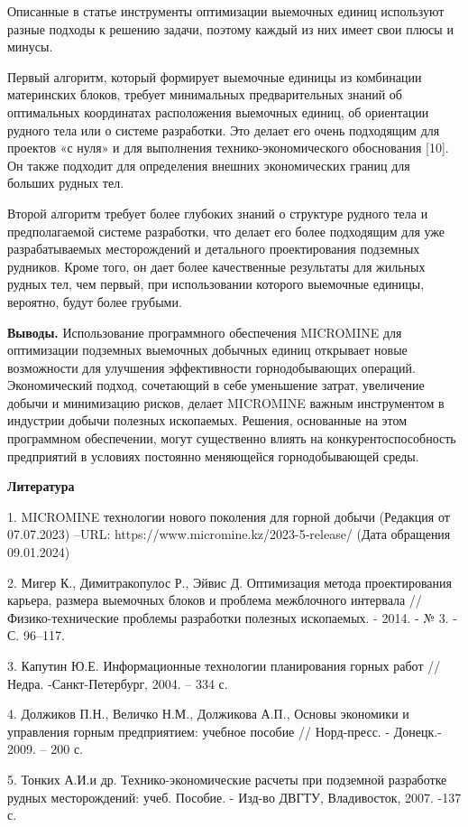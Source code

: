 Описанные в статье инструменты оптимизации выемочных единиц используют
разные подходы к решению задачи, поэтому каждый из них имеет свои плюсы
и минусы.

Первый алгоритм, который формирует выемочные единицы из комбинации
материнских блоков, требует минимальных предварительных знаний об
оптимальных координатах расположения выемочных единиц, об ориентации
рудного тела или о системе разработки. Это делает его очень подходящим
для проектов «с нуля» и для выполнения технико-экономического
обоснования {[}10{]}. Он также подходит для определения внешних
экономических границ для больших рудных тел.

Второй алгоритм требует более глубоких знаний о структуре рудного тела и
предполагаемой системе разработки, что делает его более подходящим для
уже разрабатываемых месторождений и детального проектирования подземных
рудников. Кроме того, он дает более качественные результаты для жильных
рудных тел, чем первый, при использовании которого выемочные единицы,
вероятно, будут более грубыми.

{\bfseries Выводы.} Использование программного обеспечения MICROMINE для
оптимизации подземных выемочных добычных единиц открывает новые
возможности для улучшения эффективности горнодобывающих операций.
Экономический подход, сочетающий в себе уменьшение затрат, увеличение
добычи и минимизацию рисков, делает MICROMINE важным инструментом в
индустрии добычи полезных ископаемых. Решения, основанные на этом
программном обеспечении, могут существенно влиять на
конкурентоспособность предприятий в условиях постоянно меняющейся
горнодобывающей среды.

{\bfseries Литература}

1. MICROMINE технологии нового поколения для горной добычи (Редакция от
07.07.2023) --URL: https://www.micromine.kz/2023-5-release/ (Дата
обращения 09.01.2024)

2. Мигер К., Димитракопулос Р., Эйвис Д. Оптимизация метода
проектирования карьера, размера выемочных блоков и проблема межблочного
интервала //Физико-технические проблемы разработки полезных ископаемых.
- 2014. - № 3. - С. 96--117.

3. Капутин Ю.Е. Информационные технологии планирования горных работ //
Недра. -Санкт-Петербург, 2004. -- 334 с.

4. Должиков П.Н., Величко Н.М., Должикова А.П., Основы экономики и
управления горным предприятием: учебное пособие // Норд-пресс. -
Донецк.- 2009. -- 200 с.

5. Тонких А.И.и др. Технико-экономические расчеты при подземной
разработке рудных месторождений: учеб. Пособие. - Изд-во ДВГТУ,
Владивосток, 2007. -137 с.

